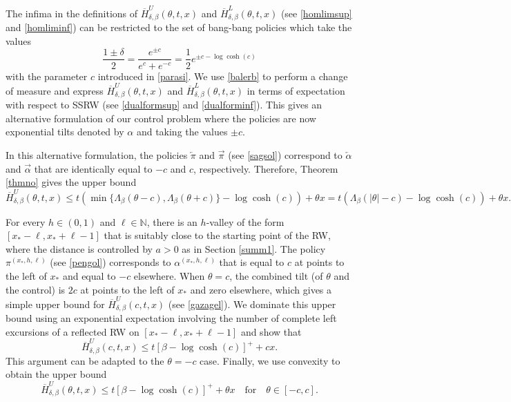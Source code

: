 \documentclass[a4paper]{amsart}
\numberwithin{equation}{section}
\theoremstyle{plain}
\theoremstyle{remark}
\begin{document}
The infima in the definitions of $\overline H_{\delta,\beta}^U(\theta,t,x)$ and $\overline H_{\delta,\beta}^L(\theta,t,x)$ (see \eqref{homlimsup} and \eqref{homliminf}) can be restricted to the set of bang-bang policies which take the values 
\begin{equation}\label{balerb}
\frac{1\pm\delta}{2} = \frac{e^{\pm c}}{e^c + e^{-c}} = \frac1{2}e^{\pm c - \log\cosh(c)}
\end{equation}
with the parameter $c$ introduced in \eqref{parasi}. We use \eqref{balerb} to perform a change of measure and express $\overline H_{\delta,\beta}^U(\theta,t,x)$ and $\overline H_{\delta,\beta}^L(\theta,t,x)$ in terms of expectation with respect to SSRW (see \eqref{dualformsup} and \eqref{dualforminf}). This gives an alternative formulation of our control problem where the policies are now exponential tilts denoted by $\alpha$ and taking the values $\pm c$.

In this alternative formulation, the policies ${\overleftarrow\pi}$ and ${\overrightarrow\pi}$ (see \eqref{sagsol}) correspond to ${\overleftarrow\alpha}$ and ${\overrightarrow\alpha}$ that are identically equal to $-c$ and $c$, respectively. Therefore, Theorem \ref{thmno} gives the upper bound
\begin{equation}\label{ekinoz}
\overline H_{\delta,\beta}^U(\theta,t,x) \le t\left(\min\{\Lambda_\beta(\theta - c), \Lambda_\beta(\theta + c)\} - \log\cosh(c)\right) + \theta x = t\left(\Lambda_\beta(|\theta| - c) - \log\cosh(c)\right) + \theta x.
\end{equation}

For every $h\in(0,1)$ and $\ell\in\mathbb{N}$, there is an $h$-valley of the form $[x_*-\ell,x_*+\ell-1]$ that is suitably close to the starting point of the RW, where the distance is controlled by $a>0$ as in Section \ref{summ1}. The policy ${\pi^{(x_*,h,\ell)}}$ (see \eqref{pengol}) corresponds to ${\alpha^{(x_*,h,\ell)}}$ that is equal to $c$ at points to the left of $x_*$ and equal to $-c$ elsewhere. When $\theta = c$, the combined tilt (of $\theta$ and the control) is $2c$ at points to the left of $x_*$ and zero elsewhere, which gives a simple upper bound for $\overline H_{\delta,\beta}^U(c,t,x)$ (see \eqref{gazagel}). We dominate this upper bound using an exponential expectation involving the number of complete left excursions of a reflected RW on $[x_*-\ell,x_*+\ell-1]$ and show that
$$\overline H_{\delta,\beta}^U(c,t,x) \le t[\beta - \log\cosh(c)]^+ + cx.$$
This argument can be adapted to the $\theta = -c$ case. Finally, 
we use convexity to obtain the upper bound
\begin{equation}\label{asalk}
\overline H_{\delta,\beta}^U(\theta,t,x) \le t[\beta - \log\cosh(c)]^+ + \theta x\quad\text{for}\quad\theta\in[-c,c].
\end{equation}
\end{document}
